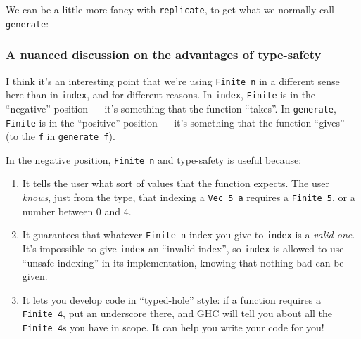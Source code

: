\documentclass[]{article}
\newenvironment{Shaded}{}{}
\newcommand{\KeywordTok}[1]{\textcolor[rgb]{0.00,0.44,0.13}{\textbf{#1}}}
\newcommand{\DataTypeTok}[1]{\textcolor[rgb]{0.56,0.13,0.00}{#1}}
\newcommand{\CommentTok}[1]{\textcolor[rgb]{0.38,0.63,0.69}{\textit{#1}}}
\newcommand{\OtherTok}[1]{\textcolor[rgb]{0.00,0.44,0.13}{#1}}
\newcommand{\FunctionTok}[1]{\textcolor[rgb]{0.02,0.16,0.49}{#1}}
\newcommand{\NormalTok}[1]{#1}
\begin{document}
We can be a little more fancy with \texttt{replicate}, to get what we normally
call \texttt{generate}:

\begin{Shaded}
\end{Shaded}

\subsubsection{A nuanced discussion on the advantages of
type-safety}\label{a-nuanced-discussion-on-the-advantages-of-type-safety}

I think it's an interesting point that we're using \texttt{Finite\ n} in a
different sense here than in \texttt{index}, and for different reasons. In
\texttt{index}, \texttt{Finite} is in the ``negative'' position --- it's
something that the function ``takes''. In \texttt{generate}, \texttt{Finite} is
in the ``positive'' position --- it's something that the function ``gives'' (to
the \texttt{f} in \texttt{generate\ f}).

In the negative position, \texttt{Finite\ n} and type-safety is useful because:

\begin{enumerate}
\def\labelenumi{\arabic{enumi}.}
\tightlist
\item
  It tells the user what sort of values that the function expects. The user
  \emph{knows}, just from the type, that indexing a \texttt{Vec\ 5\ a} requires
  a \texttt{Finite\ 5}, or a number between 0 and 4.
\item
  It guarantees that whatever \texttt{Finite\ n} index you give to
  \texttt{index} is a \emph{valid one}. It's impossible to give \texttt{index}
  an ``invalid index'', so \texttt{index} is allowed to use ``unsafe indexing''
  in its implementation, knowing that nothing bad can be given.
\item
  It lets you develop code in ``typed-hole'' style: if a function requires a
  \texttt{Finite\ 4}, put an underscore there, and GHC will tell you about all
  the \texttt{Finite\ 4}s you have in scope. It can help you write your code for
  you!
\end{enumerate}
\end{document}
